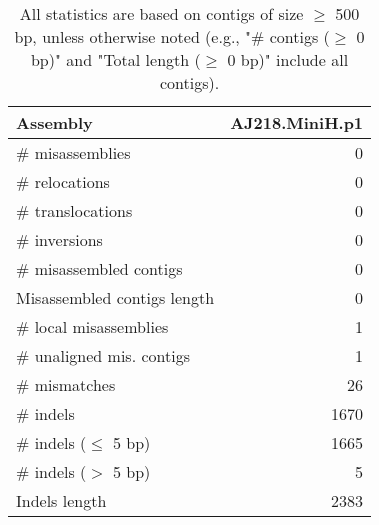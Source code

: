 \documentclass[12pt,a4paper]{article}
\begin{document}
\begin{table}[ht]
\begin{center}
\caption{All statistics are based on contigs of size $\geq$ 500 bp, unless otherwise noted (e.g., "\# contigs ($\geq$ 0 bp)" and "Total length ($\geq$ 0 bp)" include all contigs).}
\begin{tabular}{|l*{1}{|r}|}
\hline
Assembly & AJ218.MiniH.p1 \\ \hline
\# misassemblies & 0 \\ \hline
\hspace{5mm}\# relocations & 0 \\ \hline
\hspace{5mm}\# translocations & 0 \\ \hline
\hspace{5mm}\# inversions & 0 \\ \hline
\# misassembled contigs & 0 \\ \hline
Misassembled contigs length & 0 \\ \hline
\# local misassemblies & 1 \\ \hline
\# unaligned mis. contigs & 1 \\ \hline
\# mismatches & 26 \\ \hline
\# indels & 1670 \\ \hline
\hspace{5mm}\# indels ($\leq$ 5 bp) & 1665 \\ \hline
\hspace{5mm}\# indels ($>$ 5 bp) & 5 \\ \hline
Indels length & 2383 \\ \hline
\end{tabular}
\end{center}
\end{table}
\end{document}
